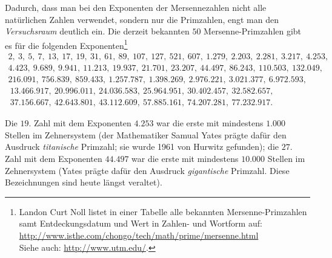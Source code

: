 \begin{refsegment}
Dadurch, dass man bei den Exponenten der Mersennezahlen nicht alle
natürlichen Zahlen verwendet, sondern nur die Primzahlen, engt man
den {\em Versuchsraum} deutlich ein. Die derzeit bekannten $50$
Mersenne-Primzahlen
gibt es für die folgenden Exponenten\footnote{%
  Landon Curt Noll listet in einer Tabelle alle
  bekannten Mersenne-Primzahlen samt Entdeckungsdatum und Wert in Zahlen-
  und Wortform auf:
      \url{http://www.isthe.com/chongo/tech/math/prime/mersenne.html}\\
  Siehe auch:
      \url{http://www.utm.edu/}.
}
$$
\begin{array}{c}
2, ~ 3, ~ 5, ~ 7, ~ 13, ~ 17, ~ 19, ~ 31, ~ 61, ~ 89, ~ 107, ~ 127, ~ 521, ~ 607, ~ 1.279, ~ 2.203, ~ 2.281, ~ 3.217, ~ 4.253, \\
4.423, ~9.689, ~ 9.941, ~ 11.213, ~ 19.937, ~ 21.701, ~ 23.207, ~ 44.497, ~ 86.243, ~ 110.503, ~ 132.049,\\
216.091, ~ 756.839, ~ 859.433, ~ 1.257.787, ~ 1.398.269, ~ 2.976.221, ~ 3.021.377, ~ 6.972.593,\\
 ~ 13.466.917, ~ 20.996.011, ~ 24.036.583, ~ 25.964.951, ~ 30.402.457, ~ 32.582.657,\\
 ~ 37.156.667, ~ 42.643.801, ~ 43.112.609, ~ 57.885.161, ~ 74.207.281, ~ 77.232.917.
\end{array}
$$


Die $19$. Zahl mit dem Exponenten $4.253$ war die erste mit mindestens $1.000$
Stellen im Zehnersystem (der Mathematiker Samual  Yates prägte dafür den Ausdruck {\em titanische}
 Primzahl; sie wurde 1961 von Hurwitz
gefunden); die $27$. Zahl mit dem Exponenten $44.497$ war die
erste mit mindestens $10.000$ Stellen im Zehnersystem (Yates
prägte dafür den Ausdruck   {\em
gigantische} Primzahl. Diese Bezeichnungen sind heute längst
veraltet).





\end{refsegment}
